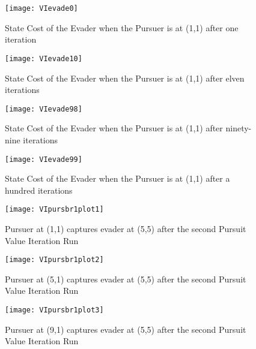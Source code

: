 \begin{figure}
\vspace{2.4in}
\centering
\texttt{[image: VIevade0]}
\caption{State Cost of the Evader when the Pursuer is at (1,1) after one iteration}
\label{VIevade0}
\end{figure}
\clearpage
\newpage

\begin{figure}
\vspace{2.4in}
\centering
\texttt{[image: VIevade10]}
\caption{State Cost of the Evader when the Pursuer is at (1,1) after elven iterations}
\label{VIevade10}
\end{figure}
\clearpage
\newpage

\begin{figure}
\vspace{2.4in}
\centering
\texttt{[image: VIevade98]}
\caption{State Cost of the Evader when the Pursuer is at (1,1) after ninety-nine iterations}
\label{VIevade98}
\end{figure}
\clearpage
\newpage

\begin{figure}
\vspace{2.4in}
\centering
\texttt{[image: VIevade99]}
\caption{State Cost of the Evader when the Pursuer is at (1,1) after a hundred iterations}
\label{VIevade99}
\end{figure}
\clearpage
\newpage

\begin{figure}
\vspace{2.4in}
\centering
\texttt{[image: VIpursbr1plot1]}
\caption{Pursuer at (1,1) captures evader at (5,5) after the second Pursuit Value Iteration Run}
\label{VIpursbr1plot1}
\end{figure}
\clearpage
\newpage

\begin{figure}
\vspace{2.4in}
\centering
\texttt{[image: VIpursbr1plot2]}
\caption{Pursuer at (5,1) captures evader at (5,5) after the second Pursuit Value Iteration Run}
\label{VIpursbr1plot2}
\end{figure}
\clearpage
\newpage

\begin{figure}
\vspace{2.4in}
\centering
\texttt{[image: VIpursbr1plot3]}
\caption{Pursuer at (9,1) captures evader at (5,5) after the second Pursuit Value Iteration Run}
\label{VIpursbr1plot3}
\end{figure}
\clearpage
\newpage

